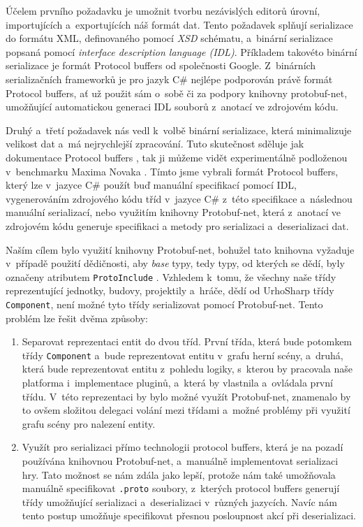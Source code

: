 Účelem prvního požadavku je umožnit tvorbu nezávislých editorů úrovní, importujících a~exportujících náš formát dat. Tento požadavek splňují serializace do formátu XML, definovaného pomocí \textit{XSD} schématu, a~binární serializace popsaná pomocí \textit{interface description language (IDL)}. Příkladem takovéto binární serializace je formát Protocol buffers \citep{site:protobuf} od společnosti Google. Z~binárních serializačních frameworků je pro jazyk C\# nejlépe podporován právě formát Protocol buffers, ať už použit sám o~sobě či za podpory knihovny protobuf-net, umožňující automatickou generaci IDL souborů z~anotací ve zdrojovém kódu. 

Druhý a~třetí požadavek nás vedl k~volbě binární serializace, která minimalizuje velikost dat a~má nejrychlejší zpracování. Tuto skutečnost sděluje jak dokumentace Protocol buffers \citep{site:protobufdevguide}, tak ji můžeme vidět experimentálně podloženou v~benchmarku Maxima Novaka \citep{site:serializationspeed}. Tímto jsme vybrali formát Protocol buffers, který lze v~jazyce C\# použít buď manuální specifikací \textit{ } pomocí IDL, vygenerováním zdrojového kódu tříd v~jazyce C\# z~této specifikace a~následnou manuální serializací, nebo využitím knihovny Protobuf-net, která z~anotací ve zdrojovém kódu generuje specifikaci \textit{ } a  metody pro serializaci a~deserializaci dat.

Naším cílem bylo využití knihovny Protobuf-net, bohužel tato knihovna vyžaduje v~případě použití dědičnosti, aby \textit{base} typy, tedy typy, od kterých se dědí, byly označeny atributem \texttt{ProtoInclude} \citep{site:protobufnet}. Vzhledem k~tomu, že všechny naše třídy reprezentující jednotky, budovy, projektily a~hráče, dědí od UrhoSharp třídy \texttt{Component}, není možné tyto třídy serializovat pomocí Protobuf-net. Tento problém lze řešit dvěma způsoby: 

\begin{enumerate}
	\item Separovat reprezentaci entit do dvou tříd. První třída, která bude potomkem třídy \texttt{Component} a~bude reprezentovat entitu v~grafu herní scény, a~druhá, která bude reprezentovat entitu z~pohledu logiky, s~kterou by pracovala naše platforma i~implementace pluginů, a~která by vlastnila a~ovládala první třídu. V~této reprezentaci by bylo možné využít Protobuf-net, znamenalo by to ovšem složitou delegaci volání mezi třídami a~možné problémy při využití grafu scény pro nalezení entity. 
	\item Využít pro serializaci přímo technologii protocol buffers, která je na pozadí používána knihovnou Protobuf-net, a~manuálně implementovat serializaci hry. Tato možnost se nám zdála jako lepší, protože nám také umožňovala manuálně specifikovat \texttt{.proto} soubory, z~kterých protocol buffers generují třídy umožňující serializaci a~deserializaci v~různých jazycích. Navíc nám tento postup umožňuje specifikovat přesnou posloupnost akcí při deserializaci.
\end{enumerate}

